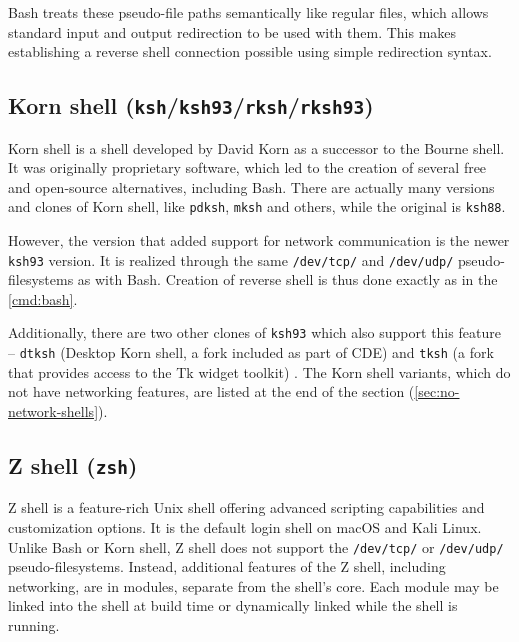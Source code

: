 Bash treats these pseudo-file paths semantically like regular files, which allows standard input and output redirection to be used with them. This makes establishing a reverse shell connection possible using simple redirection syntax.


\newpage

\subsection{Korn shell (\texttt{ksh}/\texttt{ksh93}/\texttt{rksh}/\texttt{rksh93})}


Korn shell is a shell developed by David Korn as a successor to the Bourne shell. It was originally proprietary software, which led to the creation of several free and open-source alternatives, including Bash. There are actually many versions and clones of Korn shell, like \texttt{pdksh}, \texttt{mksh} and others, while the original is \texttt{ksh88}.

However, the version that added support for network communication is the newer \texttt{ksh93} version. It is realized through the same \texttt{/dev/tcp/} and \texttt{/dev/udp/} pseudo-filesystems as with Bash. Creation of reverse shell is thus done exactly as in the \cref{cmd:bash}.


Additionally, there are two other clones of \texttt{ksh93} which also support this feature -- \texttt{dtksh} (Desktop Korn shell, a fork included as part of CDE) and \texttt{tksh} (a fork that provides access to the Tk widget toolkit) \cite{kornshell-wiki}. The Korn shell variants, which do not have networking features, are listed at the end of the section (\cref{sec:no-network-shells}).

\subsection{Z shell (\texttt{zsh})}


Z shell is a feature-rich Unix shell offering advanced scripting capabilities and customization options. It is the default login shell on macOS and Kali Linux. Unlike Bash or Korn shell, Z shell does not support the \texttt{/dev/tcp/} or \texttt{/dev/udp/} pseudo-filesystems. Instead, additional features of the Z shell, including networking, are in modules, separate from the shell's core. Each module may be linked into the shell at build time or dynamically linked while the shell is running. \cite{zshmodules-man}

